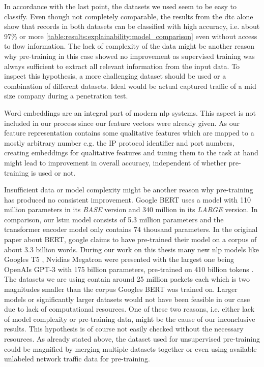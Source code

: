 In accordance with the last point, the datasets we used seem to be easy to classify. Even though not completely comparable, the results from the \gls{dtc} alone show that records in both datasets can be classified with high accuracy, i.e. about 97\% or more \ref{table:results:explainability:model_comparison} even without access to flow information.
The lack of complexity of the data might be another reason why pre-training in this case showed no improvement as supervised training was always sufficient to extract all relevant information from the input data. To inspect this hypothesis, a more challenging dataset should be used or a combination of different datasets. Ideal would be actual captured traffic of a mid size company during a penetration test. \par

Word embeddings are an integral part of modern \gls{nlp} systems. This aspect is not included in our process since our feature vectors were already given. As our feature representation contains some qualitative features which are mapped to a mostly arbitrary number e.g. the IP protocol identifier and port numbers, creating embeddings for qualitative features and tuning them to the task at hand might lead to improvement in overall accuracy, independent of whether pre-training is used or not. \par
	
Insufficient data or model complexity might be another reason why pre-training has produced no consistent improvement. Google BERT \cite{bert} uses a model with 110 million parameters in its \textit{BASE} version and 340 million in its \textit{LARGE} version. In comparison, our \gls{lstm} model consists of 5.3 million parameters and the transformer encoder model only contains 74 thousand parameters. In the original paper about BERT, google claims to have pre-trained their model on a corpus of about 3.3 billion words. During our work on this thesis many new \gls{nlp} models like Googles T5 \cite{google_t5}, Nvidias Megatron \cite{megatron} were presented with the largest one being OpenAIs GPT-3 with 175 billion parameters, pre-trained on 410 billion tokens \cite{gpt3}. The datasets we are using contain around 25 million packets each which is two magnitudes smaller than the corpus Googles BERT was trained on. Larger models or significantly larger datasets would not have been feasible in our case due to lack of computational resources. One of these two reasons, i.e. either lack of model complexity or pre-training data, might be the cause of our inconclusive results. This hypothesis is of course not easily checked without the necessary resources. As already stated above, the dataset used for unsupervised pre-training could be magnified by merging multiple datasets together or even using available unlabeled network traffic data for pre-training. \par

